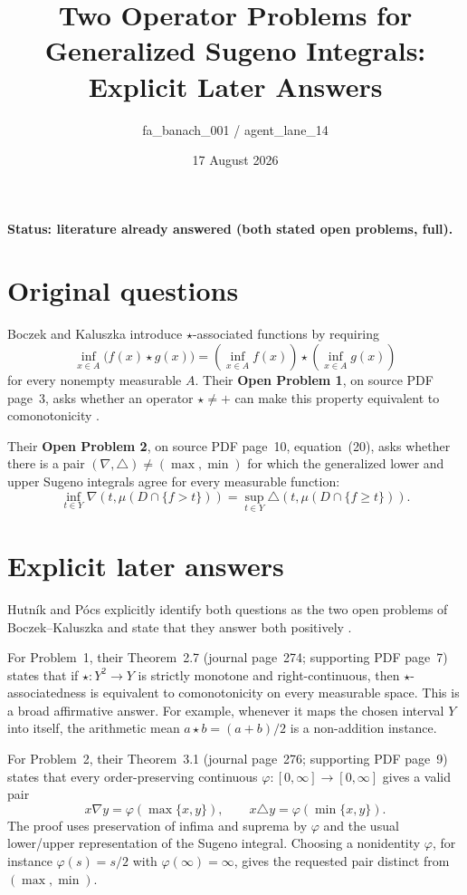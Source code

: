 \documentclass[10pt]{article}
\title{Two Operator Problems for Generalized Sugeno Integrals:\\
Explicit Later Answers}
\author{fa\_banach\_001 / agent\_lane\_14}
\date{17 August 2026}
\begin{document}
\maketitle

\noindent\textbf{Status: literature already answered (both stated open
problems, full).}

\section*{Original questions}

Boczek and Kaluszka introduce $\star$-associated functions by requiring
\[
 \inf_{x\in A}\bigl(f(x)\star g(x)\bigr)
 =\left(\inf_{x\in A}f(x)\right)\star
  \left(\inf_{x\in A}g(x)\right)
\]
for every nonempty measurable $A$.  Their \textbf{Open Problem 1}, on source
PDF page~3, asks whether an operator $\star\ne +$ can make this property
equivalent to comonotonicity \cite{BK}.

Their \textbf{Open Problem 2}, on source PDF page~10, equation~(20), asks
whether there is a pair $(\nabla,\triangle)\ne(\max,\min)$ for which the
generalized lower and upper Sugeno integrals agree for every measurable
function:
\[
 \inf_{t\in Y}\nabla\!\left(t,\mu(D\cap\{f>t\})\right)
 =
 \sup_{t\in Y}\triangle\!\left(t,\mu(D\cap\{f\ge t\})\right).
\]

\section*{Explicit later answers}

Hutn\'ik and P\'ocs explicitly identify both questions as the two open
problems of Boczek--Kaluszka and state that they answer both positively
\cite{HP}.

For Problem~1, their Theorem~2.7 (journal page~274; supporting PDF page~7)
states that if $\star:Y^2\to Y$ is strictly monotone and right-continuous,
then $\star$-associatedness is equivalent to comonotonicity on every
measurable space.  This is a broad affirmative answer.  For example, whenever
it maps the chosen interval $Y$ into itself, the arithmetic mean
$a\star b=(a+b)/2$ is a non-addition instance.

For Problem~2, their Theorem~3.1 (journal page~276; supporting PDF page~9)
states that every order-preserving continuous
$\varphi:[0,\infty]\to[0,\infty]$ gives a valid pair
\[
 x\nabla y=\varphi(\max\{x,y\}),\qquad
 x\triangle y=\varphi(\min\{x,y\}).
\]
The proof uses preservation of infima and suprema by $\varphi$ and the usual
lower/upper representation of the Sugeno integral.  Choosing a nonidentity
$\varphi$, for instance $\varphi(s)=s/2$ with
$\varphi(\infty)=\infty$, gives the requested pair distinct from
$(\max,\min)$.
\end{document}

